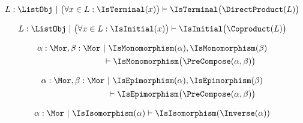 \begin{sequent}
\begin{align*}
  L: \ListObj ~|~ \big(\forall x \in L: \IsTerminal(x)\big) \vdash \IsTerminal\big( \DirectProduct( L ) \big)
\end{align*}
\end{sequent}

\begin{sequent}
\begin{align*}
  L: \ListObj ~|~ \big(\forall x \in L: \IsInitial(x)\big) \vdash \IsInitial\big( \Coproduct( L ) \big)
\end{align*}
\end{sequent}

\begin{sequent}
\begin{align*}
 \alpha:\Mor, \beta:\Mor ~&|~ \IsMonomorphism( \alpha ), \IsMonomorphism( \beta )  \\
 &\vdash \IsMonomorphism\big( \PreCompose( \alpha, \beta ) \big)
\end{align*}
\end{sequent}

\begin{sequent}
\begin{align*}
 \alpha:\Mor, \beta:\Mor ~&|~ \IsEpimorphism( \alpha ), \IsEpimorphism( \beta )  \\
 &\vdash \IsEpimorphism\big( \PreCompose( \alpha, \beta ) \big)
\end{align*}
\end{sequent}

\begin{sequent}
\begin{align*}
 \alpha:\Mor ~|~ \IsIsomorphism( \alpha ) \vdash \IsIsomorphism( \Inverse( \alpha ) )
\end{align*}
\end{sequent}
